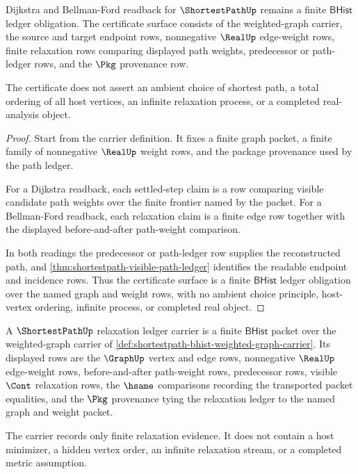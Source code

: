 \begin{theorem}
\label{thm:shortestpath-relaxation-certificate-scope}
Dijkstra and Bellman-Ford readback for $\ShortestPathUp$ remains a finite
$\mathsf{BHist}$ ledger obligation. The certificate surface consists of the
weighted-graph carrier, the source and target endpoint rows, nonnegative
$\RealUp$ edge-weight rows, finite relaxation rows comparing displayed path
weights, predecessor or path-ledger rows, and the $\Pkg$ provenance row.

The certificate does not assert an ambient choice of shortest path, a total
ordering of all host vertices, an infinite relaxation process, or a completed
real-analysis object.
\end{theorem}
\begin{proof}
Start from the carrier definition. It fixes a finite graph packet, a finite
family of nonnegative $\RealUp$ weight rows, and the package provenance used by
the path ledger.

For a Dijkstra readback, each settled-step claim is a row comparing visible
candidate path weights over the finite frontier named by the packet. For a
Bellman-Ford readback, each relaxation claim is a finite edge row together
with the displayed before-and-after path-weight comparison.

In both readings the predecessor or path-ledger row supplies the reconstructed
path, and \autoref{thm:shortestpath-visible-path-ledger} identifies the
readable endpoint and incidence rows. Thus the certificate surface is a finite
$\mathsf{BHist}$ ledger obligation over the named graph and weight rows, with
no ambient choice principle, host-vertex ordering, infinite process, or
completed real object.
\end{proof}

\begin{definition}
\label{def:shortestpath-relaxation-ledger-carrier}
A $\ShortestPathUp$ relaxation ledger carrier is a finite $\mathsf{BHist}$
packet over the weighted-graph carrier of
\autoref{def:shortestpath-bhist-weighted-graph-carrier}. Its displayed rows
are the $\GraphUp$ vertex and edge rows, nonnegative $\RealUp$ edge-weight
rows, before-and-after path-weight rows, predecessor rows, visible $\Cont$
relaxation rows, the $\hsame$ comparisons recording the transported packet
equalities, and the $\Pkg$ provenance tying the relaxation ledger to the named
graph and weight packet.

The carrier records only finite relaxation evidence. It does not contain a
host minimizer, a hidden vertex order, an infinite relaxation stream, or a
completed metric assumption.
\end{definition}

